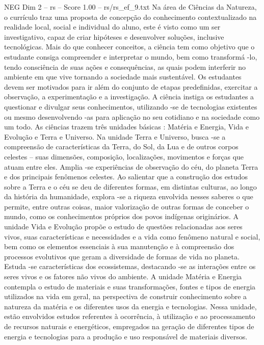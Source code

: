 \begin{textsample}{NEG Dim 2 – rs – Score 1.00 – rs/rs\_ef\_9.txt}  \label{ex:f2_neg_217}
Na área de Ciências da Natureza, o currículo traz uma proposta de concepção do conhecimento contextualizado na realidade local, social e individual do aluno, este é visto como um ser investigativo, capaz de criar hipóteses e desenvolver soluções, inclusive tecnológicas.
Mais do que conhecer conceitos, a ciência tem como objetivo que o estudante consiga compreender e interpretar o mundo, bem como transformá -lo, tendo consciência de suas ações e consequências, as quais podem interferir no ambiente em que vive tornando a sociedade mais sustentável.
Os estudantes devem ser motivados para ir além do conjunto de etapas predefinidas, exercitar a observação, a experimentação e a investigação.
A ciência instiga os estudantes a questionar e divulgar seus conhecimentos, utilizando -se de tecnologias existentes ou mesmo desenvolvendo -as para aplicação no seu cotidiano e na sociedade como um todo.
As ciências trazem três unidades básicas : Matéria e Energia, Vida e Evolução e Terra e Universo.
Na unidade Terra e Universo, busca -se a compreensão de características da Terra, do Sol, da Lua e de outros corpos celestes – suas dimensões, composição, localizações, movimentos e forças que atuam entre eles.
Amplia -se experiências de observação do céu, do planeta Terra e dos principais fenômenos celestes.
Ao salientar que a construção dos estudos sobre a Terra e o céu se deu de diferentes formas, em distintas culturas, ao longo da história da humanidade, explora -se a riqueza envolvida nesses saberes o que permite, entre outras coisas, maior valorização de outras formas de conceber o mundo, como os conhecimentos próprios dos povos indígenas originários.
A unidade Vida e Evolução propõe o estudo de questões relacionadas aos seres vivos, suas características e necessidades e a vida como fenômeno natural e social, bem como os elementos essenciais à sua manutenção e à compreensão dos processos evolutivos que geram a diversidade de formas de vida no planeta.
Estuda -se características dos ecossistemas, destacando -se as interações entre os seres vivos e os fatores não vivos do ambiente.
A unidade Matéria e Energia contempla o estudo de materiais e suas transformações, fontes e tipos de energia utilizados na vida em geral, na perspectiva de construir conhecimento sobre a natureza da matéria e os diferentes usos da energia e tecnologias.
Nessa unidade, estão envolvidos estudos referentes à ocorrência, à utilização e ao processamento de recursos naturais e energéticos, empregados na geração de diferentes tipos de energia e tecnologias para a produção e uso responsável de materiais diversos.

\end{textsample}
